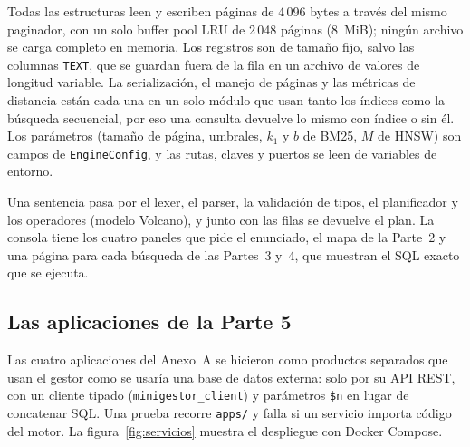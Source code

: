 Todas las estructuras leen y escriben páginas de 4\,096 bytes a través del mismo paginador,
con un solo buffer pool LRU de 2\,048 páginas (8~MiB); ningún archivo se carga completo en
memoria. Los registros son de tamaño fijo, salvo las columnas \texttt{TEXT}, que se guardan
fuera de la fila en un archivo de valores de longitud variable. La serialización, el
manejo de páginas y las métricas de distancia están cada una en un solo módulo que usan
tanto los índices como la búsqueda secuencial, por eso una consulta devuelve lo mismo con
índice o sin él. Los parámetros (tamaño de página, umbrales, $k_1$ y $b$ de BM25, $M$ de
HNSW) son campos de \texttt{EngineConfig}, y las rutas, claves y puertos se leen de
variables de entorno.

Una sentencia pasa por el lexer, el parser, la validación de tipos, el planificador y los
operadores (modelo Volcano), y junto con las filas se devuelve el plan. La consola tiene los
cuatro paneles que pide el enunciado, el mapa de la Parte~2 y una página para cada búsqueda
de las Partes~3 y~4, que muestran el SQL exacto que se ejecuta.

\subsection{Las aplicaciones de la Parte 5}

Las cuatro aplicaciones del Anexo~A se hicieron como productos separados que usan el gestor
como se usaría una base de datos externa: solo por su API REST, con un cliente tipado
(\texttt{minigestor\_client}) y parámetros \texttt{\$n} en lugar de concatenar SQL. Una
prueba recorre \texttt{apps/} y falla si un servicio importa código del motor. La
figura~\ref{fig:servicios} muestra el despliegue con Docker Compose.

